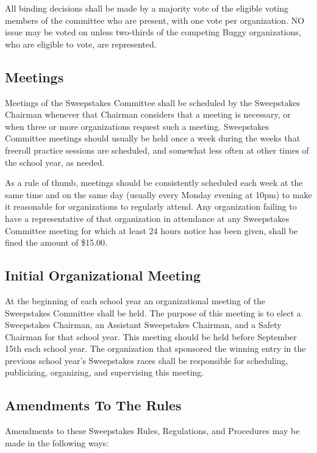 	All binding decisions shall be made by a majority vote of the eligible voting
	members of the committee who are present, with one vote per organization. NO
	issue may be voted on unless two-thirds of the competing Buggy organizations,
	who are eligible to vote, are represented.

\subsection{Meetings}

	Meetings of the Sweepstakes Committee shall be scheduled by the Sweepstakes
	Chairman whenever that Chairman considers that a meeting is necessary, or when
	three or more organizations request such a meeting. Sweepstakes Committee
	meetings should usually be held once a week during the weeks that freeroll
	practice sessions are scheduled, and somewhat less often at other times of the
	school year, as needed.

	As a rule of thumb, meetings should be consistently scheduled each week at the
	same time and on the same day (usually every Monday evening at 10pm) to make it
	reasonable for organizations to regularly attend. Any organization failing to
	have a representative of that organization in attendance at any Sweepstakes
	Committee meeting for which at least 24 hours notice has been given, shall be
	fined the amount of \$15.00.

\subsection{Initial Organizational Meeting}

	At the beginning of each school year an organizational meeting of the
	Sweepstakes Committee shall be held. The purpose of this meeting is to elect a
	Sweepstakes Chairman, an Assistant Sweepstakes Chairman, and a Safety Chairman
	for that school year. This meeting should be held before September 15th each
	school year. The organization that sponsored the winning entry in the previous
	school year's Sweepstakes races shall be responsible for scheduling,
	publicizing, organizing, and supervising this meeting.

\subsection{Amendments To The Rules}

	Amendments to these Sweepstakes Rules, Regulations, and Procedures may be made
	in the following ways:

